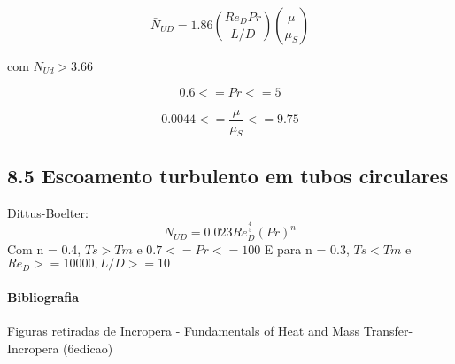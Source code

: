 \[\bar{N}_{UD}=1.86( \frac{Re_{D}Pr}{L/D} )( \frac{\mu}{\mu_{S}} )\]

com $N_{Ud}>3.66$

\[0.6 <= Pr <= 5\]

\[0.0044 <= \frac{\mu}{\mu_{S}} <= 9.75\]

\subsection*{8.5 Escoamento turbulento em tubos circulares}

Dittus-Boelter: 
\[N_{UD}=0.023Re_{D}^{\frac{4}{5}}(Pr)^{n}\]
Com n = 0.4, $Ts > Tm$ e $0.7 <=Pr<=100$
E para n = 0.3, $Ts < Tm$ e $Re_{D}>=10000, L/D >=10$

\paragraph*{Bibliografia} Figuras retiradas de Incropera - Fundamentals of Heat and Mass Transfer-Incropera (6\textordfeminine edicao)